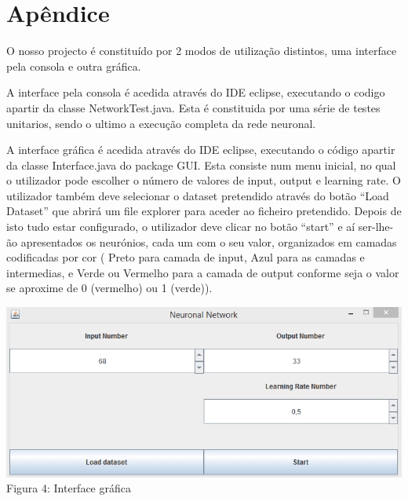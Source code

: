 \documentclass[a4paper]{article}
\begin{document}
\clearpage


\section{Apêndice}
O nosso projecto é constituído por 2 modos de utilização distintos, uma interface pela consola e outra gráfica.

A interface pela consola é acedida através do IDE eclipse, executando o codigo apartir da classe NetworkTest.java. Esta é constituida por uma série de testes unitarios, sendo o ultimo a execução completa da rede neuronal.

A interface gráfica é acedida através do IDE eclipse, executando o código apartir da classe Interface.java do package GUI. Esta consiste num menu inicial, no qual o utilizador pode escolher o número de valores de input, output e learning rate. O utilizador também deve selecionar o dataset pretendido através do botão “Load Dataset” que abrirá um file explorer para aceder ao ficheiro pretendido. Depois de isto tudo estar configurado, o utilizador deve clicar no botão “start” e aí ser-lhe-ão apresentados os neurónios, cada um com o seu valor, organizados em camadas codificadas por cor ( Preto para camada de input, Azul para as camadas e intermedias, e Verde ou Vermelho para a camada de output conforme seja o valor se aproxime de 0 (vermelho) ou 1 (verde)).

\includegraphics[scale=0.5]{client.png}
\\Figura 4: Interface gráfica\linebreak\linebreak
\end{document}
